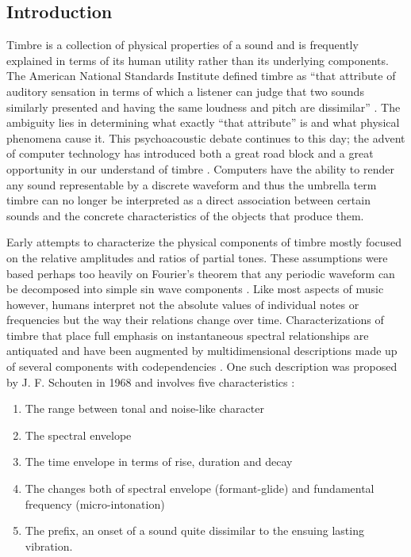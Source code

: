 \documentclass[12pt]{article}
\begin{document}
\subsection{Introduction}\label{TMINTRO}
Timbre is a collection of physical properties of a sound and is frequently explained in terms of its human utility rather than its underlying components. The American National Standards Institute defined timbre as ``that attribute of auditory sensation in terms of which a listener can judge that two sounds similarly presented and having the same loudness and pitch are dissimilar'' \citep{american1960american}. The ambiguity lies in determining what exactly ``that attribute'' is and what physical phenomena cause it. This psychoacoustic debate continues to this day; the advent of computer technology has introduced both a great road block and a great opportunity in our understand of timbre \citep{erickson1975sound}. Computers have the ability to render any sound representable by a discrete waveform and thus the umbrella term timbre can no longer be interpreted as a direct association between certain sounds and the concrete characteristics of the objects that produce them.

Early attempts to characterize the physical components of timbre mostly focused on the relative amplitudes and ratios of partial tones. These assumptions were based perhaps too heavily on Fourier's theorem that any periodic waveform can be decomposed into simple sin wave components \citep{helmholtz1857physiological, helmholtz1954sensations}. Like most aspects of music however, humans interpret not the absolute values of individual notes or frequencies but the way their relations change over time. Characterizations of timbre that place full emphasis on instantaneous spectral relationships are antiquated and have been augmented by multidimensional descriptions made up of several components with codependencies \citep{erickson1975sound}. One such description was proposed by J. F. Schouten in 1968 and involves five characteristics \citep{schouten1968perception, erickson1975sound}:
\begin{enumerate}
\item
The range between tonal and noise-like character
\item
The spectral envelope
\item
The time envelope in terms of rise, duration and decay
\item
The changes both of spectral envelope (formant-glide) and fundamental frequency (micro-intonation)
\item
The prefix, an onset of a sound quite dissimilar to the ensuing lasting vibration.
\end{enumerate}
\end{document}
